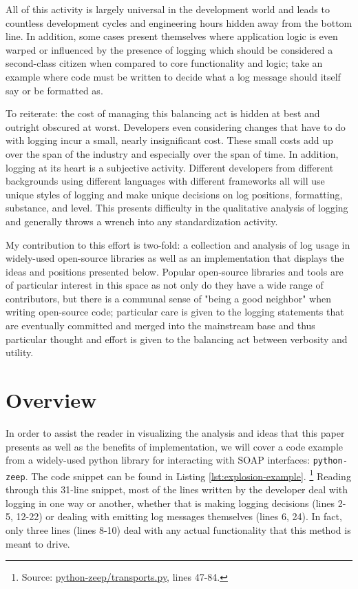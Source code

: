 \documentclass[acmsmall,review,authorversion]{acmart}
\begin{document}
    All of this activity is largely universal in the development world and leads to countless development cycles and engineering hours hidden away from the bottom line. In addition, some cases present themselves where application logic is even warped or influenced by the presence of logging which should be considered a second-class citizen when compared to core functionality and logic; take an example where code must be written to decide what a log message should itself say or be formatted as.
    
    To reiterate: the cost of managing this balancing act is hidden at best and outright obscured at worst. Developers even considering changes that have to do with logging incur a small, nearly insignificant cost. These small costs add up over the span of the industry and especially over the span of time. In addition, logging at its heart is a subjective activity. Different developers from different backgrounds using different languages with different frameworks all will use unique styles of logging and make unique decisions on log positions, formatting, substance, and level. This presents difficulty in the qualitative analysis of logging and generally throws a wrench into any standardization activity.
    
    My contribution to this effort is two-fold: a collection and analysis of log usage in widely-used open-source libraries as well as an implementation that displays the ideas and positions presented below. Popular open-source libraries and tools are of particular interest in this space as not only do they have a wide range of contributors, but there is a communal sense of "being a good neighbor" when writing open-source code; particular care is given to the logging statements that are eventually committed and merged into the mainstream base and thus particular thought and effort is given to the balancing act between verbosity and utility.

\section{Overview}

    In order to assist the reader in visualizing the analysis and ideas that this paper presents as well as the benefits of implementation, we will cover a code example from a widely-used python library for interacting with SOAP interfaces: \lstinline{python-zeep}. The code snippet can be found in Listing \ref{lst:explosion-example}. \footnote{Source: \href{https://github.com/mvantellingen/python-zeep/blob/4df383021e31372c111bc26cbf2e4535deaee04e/src/zeep/transports.py\#L47}{python-zeep/transports.py}, lines 47-84.} Reading through this 31-line snippet, most of the lines written by the developer deal with logging in one way or another, whether that is making logging decisions (lines 2-5, 12-22) or dealing with emitting log messages themselves (lines 6, 24). In fact, only three lines (lines 8-10) deal with any actual functionality that this method is meant to drive. 
    
\end{document}
